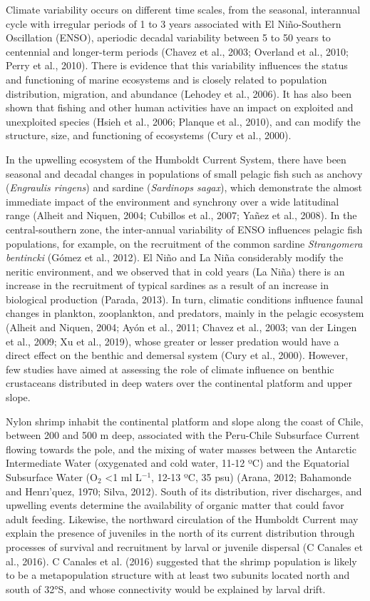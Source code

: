 \documentclass[12pt]{article}
\begin{document}
Climate variability occurs on different time scales, from the seasonal,
interannual cycle with irregular periods of 1 to 3 years associated with
El Niño-Southern Oscillation (ENSO), aperiodic decadal variability
between 5 to 50 years to centennial and longer-term periods (Chavez et
al., 2003; Overland et al., 2010; Perry et al., 2010). There is evidence
that this variability influences the status and functioning of marine
ecosystems and is closely related to population distribution, migration,
and abundance (Lehodey et al., 2006). It has also been shown that
fishing and other human activities have an impact on exploited and
unexploited species (Hsieh et al., 2006; Planque et al., 2010), and can
modify the structure, size, and functioning of ecosystems (Cury et al.,
2000).

In the upwelling ecosystem of the Humboldt Current System, there have
been seasonal and decadal changes in populations of small pelagic fish
such as anchovy (\emph{Engraulis ringens}) and sardine (\emph{Sardinops
sagax}), which demonstrate the almost immediate impact of the
environment and synchrony over a wide latitudinal range (Alheit and
Niquen, 2004; Cubillos et al., 2007; Yañez et al., 2008). In the
central-southern zone, the inter-annual variability of ENSO influences
pelagic fish populations, for example, on the recruitment of the common
sardine \emph{Strangomera bentincki} (Gómez et al., 2012). El Niño and
La Niña considerably modify the neritic environment, and we observed
that in cold years (La Niña) there is an increase in the recruitment of
typical sardines as a result of an increase in biological production
(Parada, 2013). In turn, climatic conditions influence faunal changes in
plankton, zooplankton, and predators, mainly in the pelagic ecosystem
(Alheit and Niquen, 2004; Ayón et al., 2011; Chavez et al., 2003; van
der Lingen et al., 2009; Xu et al., 2019), whose greater or lesser
predation would have a direct effect on the benthic and demersal system
(Cury et al., 2000). However, few studies have aimed at assessing the
role of climate influence on benthic crustaceans distributed in deep
waters over the continental platform and upper slope.

Nylon shrimp inhabit the continental platform and slope along the coast
of Chile, between 200 and 500 m deep, associated with the Peru-Chile
Subsurface Current flowing towards the pole, and the mixing of water
masses between the Antarctic Intermediate Water (oxygenated and cold
water, 11-12 ºC) and the Equatorial Subsurface Water (O\(_2\)
\textless{}1 ml L\(^{-1}\), 12-13 ºC, 35 psu) (Arana, 2012; Bahamonde
and Henrı'quez, 1970; Silva, 2012). South of its distribution, river
discharges, and upwelling events determine the availability of organic
matter that could favor adult feeding. Likewise, the northward
circulation of the Humboldt Current may explain the presence of
juveniles in the north of its current distribution through processes of
survival and recruitment by larval or juvenile dispersal (C Canales et
al., 2016). C Canales et al. (2016) suggested that the shrimp population
is likely to be a metapopulation structure with at least two subunits
located north and south of 32°S, and whose connectivity would be
explained by larval drift.
\end{document}
